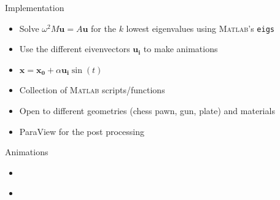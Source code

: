 \documentclass{beamer}[10pt]
\begin{document}
\begin{frame}{Implementation}
\begin{itemize}
\item {Solve $	\omega^2 M\boldsymbol{u} = A\boldsymbol{u}$ for the $k$ lowest eigenvalues using \textsc{Matlab}'s \texttt{eigs}}
\item {Use the different eivenvectors $\boldsymbol{u_i}$ to make animations}
\item {$\boldsymbol{x}=\boldsymbol{x_0}+\alpha \boldsymbol{u_i}\sin(t)$}
\item {Collection of \textsc{Matlab} scripts/functions}
\item {Open to different geometries (chess pawn, gun, plate) and materials}
\item {ParaView for the post processing}
\end{itemize}
\end{frame}

\begin{frame}{Animations}
\begin{itemize}
\item{
\href{http://www.youtube.com/watch?v=yc8ZH4cEz5g&feature=youtu.be}{}
}
\item{
\href{http://www.youtube.com/watch?v=zDAihCeC7Oo&feature=youtu.be}{}
}
\end{itemize}
\end{frame}
\end{document}
